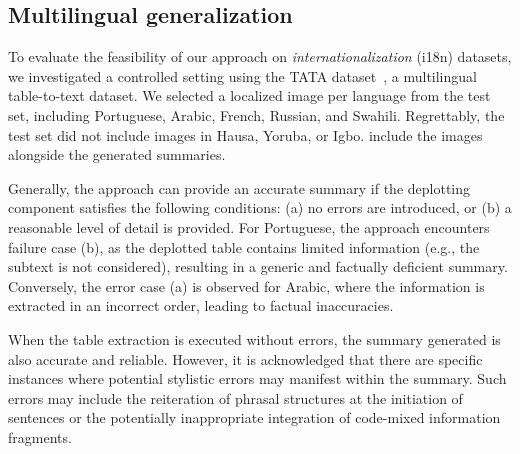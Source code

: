 \subsection{Multilingual generalization}

To evaluate the feasibility of our approach on \emph{internationalization} (i18n) datasets, we investigated a controlled setting using the TATA dataset~\cite{gehrmann2022tata}, a multilingual table-to-text dataset. 
We selected a localized image per language from the test set, including Portuguese, Arabic, French, Russian, and Swahili. 
Regrettably, the test set did not include images in Hausa, Yoruba, or Igbo.  include the images alongside the generated summaries.

Generally, the approach can provide an accurate summary if the deplotting component satisfies the following conditions: (a) no errors are introduced, or (b) a reasonable level of detail is provided. For Portuguese, the approach encounters failure case (b), as the deplotted table contains limited information (e.g., the subtext is not considered), resulting in a generic and factually deficient summary. Conversely, the error case (a) is observed for Arabic, where the information is extracted in an incorrect order, leading to factual inaccuracies.

When the table extraction is executed without errors, the summary generated is also accurate and reliable.%
However, it is acknowledged that there are specific instances where potential stylistic errors may manifest within the summary.
Such errors may include the reiteration of phrasal structures at the initiation of sentences or the potentially inappropriate integration of code-mixed information fragments.

